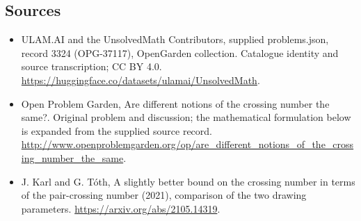 \documentclass[11pt,a4paper]{article}
\begin{document}
\subsection{Sources}
\begin{itemize}
\item[S1] ULAM.AI and the UnsolvedMath Contributors, supplied problems.json, record 3324 (OPG-37117), OpenGarden collection. Catalogue identity and source transcription; CC BY 4.0.
\url{https://huggingface.co/datasets/ulamai/UnsolvedMath}.
\item[S2] Open Problem Garden, Are different notions of the crossing number the same?. Original problem and discussion; the mathematical formulation below is expanded from the supplied source record.
\url{http://www.openproblemgarden.org/op/are_different_notions_of_the_crossing_number_the_same}.
\item[S3] J. Karl and G. Tóth, A slightly better bound on the crossing number in terms of the pair-crossing number (2021), comparison of the two drawing parameters.
\url{https://arxiv.org/abs/2105.14319}.
\end{itemize}
\end{document}
